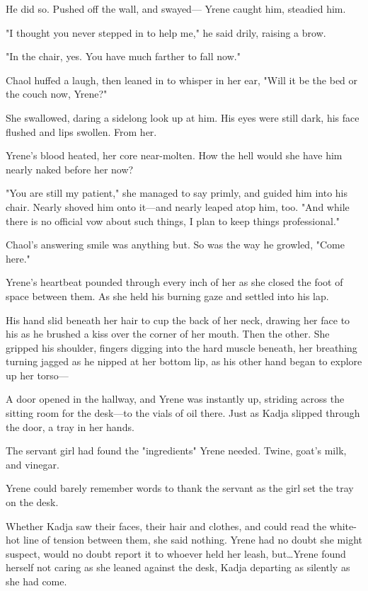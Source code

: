 He did so.
Pushed off the wall, and swayed--- Yrene caught him, steadied him.

"I thought you never stepped in to help me," he said drily, raising a brow.

"In the chair, yes.
You have much farther to fall now."

Chaol huffed a laugh, then leaned in to whisper in her ear, "Will it be the bed or the couch now, Yrene?"

She swallowed, daring a sidelong look up at him.
His eyes were still dark, his face flushed and lips swollen.
From her.

Yrene's blood heated, her core near-molten.
How the hell would she have him nearly naked before her now?

"You are still my patient," she managed to say primly, and guided him into his chair.
Nearly shoved him onto it---and nearly leaped atop him, too.
"And while there is no official vow about such things, I plan to keep things professional."

Chaol's answering smile was anything but.
So was the way he growled, "Come here."

Yrene's heartbeat pounded through every inch of her as she closed the foot of space between them.
As she held his burning gaze and settled into his lap.

His hand slid beneath her hair to cup the back of her neck, drawing her face to his as he brushed a kiss over the corner of her mouth.
Then the other.
She gripped his shoulder, fingers digging into the hard muscle beneath, her breathing turning jagged as he nipped at her bottom lip, as his other hand began to explore up her torso---

A door opened in the hallway, and Yrene was instantly up, striding across the sitting room for the desk---to the vials of oil there.
Just as Kadja slipped through the door, a tray in her hands.

The servant girl had found the "ingredients" Yrene needed.
Twine, goat's milk, and vinegar.

Yrene could barely remember words to thank the servant as the girl set the tray on the desk.

Whether Kadja saw their faces, their hair and clothes, and could read the white-hot line of tension between them, she said nothing.
Yrene had no doubt she might suspect, would no doubt report it to whoever held her leash, but\ldots Yrene found herself not caring as she leaned against the desk, Kadja departing as silently as she had come.

